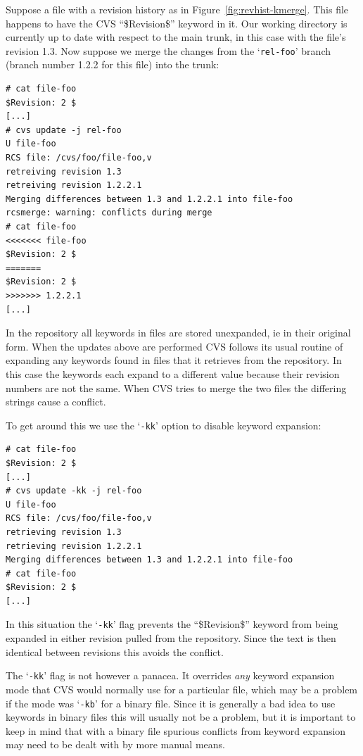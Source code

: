 \documentclass[12pt,letterpaper]{article}
\newcommand{\cmd}[1]{`\texttt{#1}'}
\begin{document}
Suppose a file with a revision history as in Figure~\ref{fig:revhist-kmerge}.
This file happens to have the CVS ``\$Revision\$'' keyword in it.  Our working
directory is currently up to date with respect to the main trunk, in this case
with the file's revision 1.3.  Now suppose we merge the changes from the
\cmd{rel-foo} branch (branch number 1.2.2 for this file) into the trunk:

\begin{Verbatim}
# cat file-foo
$Revision: 2 $
[...]
# cvs update -j rel-foo
U file-foo
RCS file: /cvs/foo/file-foo,v
retreiving revision 1.3
retreiving revision 1.2.2.1
Merging differences between 1.3 and 1.2.2.1 into file-foo
rcsmerge: warning: conflicts during merge
# cat file-foo
<<<<<<< file-foo
$Revision: 2 $
=======
$Revision: 2 $
>>>>>>> 1.2.2.1
[...]
\end{Verbatim}

In the repository all keywords in files are stored unexpanded, ie in their
original form.  When the updates above are performed CVS follows its usual
routine of expanding any keywords found in files that it retrieves
from the repository.  In this case the keywords each expand to a different
value because their revision numbers are not the same.  When CVS tries to
merge the two files the differing strings cause a conflict.

To get around this we use the \cmd{-kk} option to disable keyword
expansion:

\begin{Verbatim}
# cat file-foo
$Revision: 2 $
[...]
# cvs update -kk -j rel-foo
U file-foo
RCS file: /cvs/foo/file-foo,v
retrieving revision 1.3
retrieving revision 1.2.2.1
Merging differences between 1.3 and 1.2.2.1 into file-foo
# cat file-foo
$Revision: 2 $
[...]
\end{Verbatim}

In this situation the \cmd{-kk} flag prevents the ``\$Revision\$'' keyword
from being expanded in either revision pulled from the repository.  Since the
text is then identical between revisions this avoids the conflict.

The \cmd{-kk} flag is not however a panacea.  It overrides \emph{any} keyword
expansion mode that CVS would normally use for a particular file, which may be
a problem if the mode was \cmd{-kb} for a binary file.  Since it is generally
a bad idea to use keywords in binary files this will usually not be a problem,
but it is important to keep in mind that with a binary file spurious conflicts
from keyword expansion may need to be dealt with by more manual means.
\end{document}
